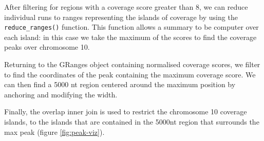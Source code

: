 \documentclass[]{article}
\newenvironment{Shaded}{\begin{snugshade}}{\end{snugshade}}
\newcommand{\DataTypeTok}[1]{\textcolor[rgb]{0.13,0.29,0.53}{#1}}
\newcommand{\DecValTok}[1]{\textcolor[rgb]{0.00,0.00,0.81}{#1}}
\newcommand{\KeywordTok}[1]{\textcolor[rgb]{0.13,0.29,0.53}{\textbf{#1}}}
\newcommand{\NormalTok}[1]{#1}
\newcommand{\OperatorTok}[1]{\textcolor[rgb]{0.81,0.36,0.00}{\textbf{#1}}}
\newcommand{\StringTok}[1]{\textcolor[rgb]{0.31,0.60,0.02}{#1}}
\begin{document}
After filtering for regions with a coverage score greater than 8, we can
reduce individual runs to ranges representing the islands of coverage by
using the \texttt{reduce\_ranges()} function. This function allows a
summary to be computer over each island: in this case we take the
maximum of the scores to find the coverage peaks over chromosome 10.

\begin{Shaded}
\end{Shaded}

Returning to the GRanges object containing normalised coverage scores,
we filter to find the coordinates of the peak containing the maximum
coverage score. We can then find a 5000 nt region centered around the
maximum position by anchoring and modifying the width.

\begin{Shaded}
\end{Shaded}

Finally, the overlap inner join is used to restrict the chromosome 10
coverage islands, to the islands that are contained in the 5000nt region
that surrounds the max peak (figure \ref{fig:peak-viz}).

\begin{Shaded}
\end{Shaded}
\end{document}

